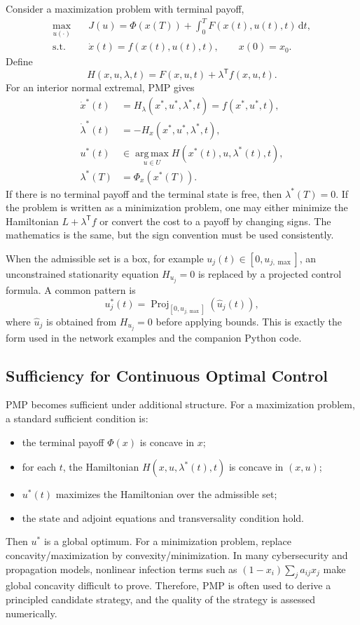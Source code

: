 \documentclass[11pt,a4paper]{article}
\newcommand{\dd}{\,\mathrm{d}}
\newcommand{\argmax}{\operatorname*{arg\,max}}
\newcommand{\Proj}{\operatorname{Proj}}
\newcommand{\T}{\mathsf{T}}
\begin{document}
Consider a maximization problem with terminal payoff,
\begin{align}
  \max_{u(\cdot)}\quad & J(u)=\Phi(x(T))+\int_0^T F(x(t),u(t),t)\dd t,\\
  \text{s.t.}\quad & \dot{x}(t)=f(x(t),u(t),t),\qquad x(0)=x_0.
\end{align}
Define
\begin{equation}
  H(x,u,\lambda,t)=F(x,u,t)+\lambda^{\T} f(x,u,t).
\end{equation}
For an interior normal extremal, PMP gives
\begin{align}
  \dot{x}^*(t)&=H_\lambda(x^*,u^*,\lambda^*,t)=f(x^*,u^*,t),\\
  \dot{\lambda}^*(t)&=-H_x(x^*,u^*,\lambda^*,t),\\
  u^*(t)&\in\argmax_{u\in U}H(x^*(t),u,\lambda^*(t),t),\\
  \lambda^*(T)&=\Phi_x(x^*(T)).
\end{align}
If there is no terminal payoff and the terminal state is free, then $\lambda^*(T)=0$. If the problem is written as a minimization problem, one may either minimize the Hamiltonian $L+\lambda^{\T}f$ or convert the cost to a payoff by changing signs. The mathematics is the same, but the sign convention must be used consistently.

When the admissible set is a box, for example $u_j(t)\in[0,u_{j,\max}]$, an unconstrained stationarity equation $H_{u_j}=0$ is replaced by a projected control formula. A common pattern is
\begin{equation}
  u_j^*(t)=\Proj_{[0,u_{j,\max}]}\left(\widehat{u}_j(t)\right),
\end{equation}
where $\widehat{u}_j$ is obtained from $H_{u_j}=0$ before applying bounds. This is exactly the form used in the network examples and the companion Python code.

\subsection{Sufficiency for Continuous Optimal Control}

PMP becomes sufficient under additional structure. For a maximization problem, a standard sufficient condition is:
\begin{itemize}
  \item the terminal payoff $\Phi(x)$ is concave in $x$;
  \item for each $t$, the Hamiltonian $H(x,u,\lambda^*(t),t)$ is concave in $(x,u)$;
  \item $u^*(t)$ maximizes the Hamiltonian over the admissible set;
  \item the state and adjoint equations and transversality condition hold.
\end{itemize}
Then $u^*$ is a global optimum. For a minimization problem, replace concavity/maximization by convexity/minimization. In many cybersecurity and propagation models, nonlinear infection terms such as $(1-x_i)\sum_j a_{ij}x_j$ make global concavity difficult to prove. Therefore, PMP is often used to derive a principled candidate strategy, and the quality of the strategy is assessed numerically.
\end{document}
